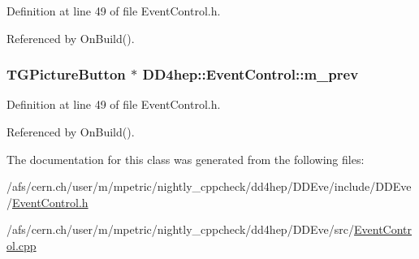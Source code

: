 Definition at line 49 of file EventControl.h.

Referenced by OnBuild().\hypertarget{class_d_d4hep_1_1_event_control_a5dc965be42f51a9499cb4fecbd269ed5}{
\subsubsection[{m\_\-prev}]{\setlength{\rightskip}{0pt plus 5cm}TGPictureButton $\ast$ {\bf DD4hep::EventControl::m\_\-prev}}}
\label{class_d_d4hep_1_1_event_control_a5dc965be42f51a9499cb4fecbd269ed5}


Definition at line 49 of file EventControl.h.

Referenced by OnBuild().

The documentation for this class was generated from the following files:\begin{DoxyCompactItemize}
\item 
/afs/cern.ch/user/m/mpetric/nightly\_\-cppcheck/dd4hep/DDEve/include/DDEve/\hyperlink{_event_control_8h}{EventControl.h}\item 
/afs/cern.ch/user/m/mpetric/nightly\_\-cppcheck/dd4hep/DDEve/src/\hyperlink{_event_control_8cpp}{EventControl.cpp}\end{DoxyCompactItemize}
